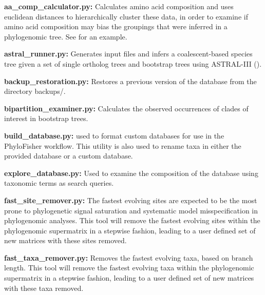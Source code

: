 \documentclass{article}
\begin{document}
    \begin{description}
    \item \textbf{aa\_comp\_calculator.py:} Calculates amino acid composition and uses euclidean distances to hierarchically cluster these data, in order to examine if amino acid composition may bias the groupings that were inferred in a phylogenomic tree. See \cite{brown_phylogenomics_2018} for an example.
    
    \item \textbf{astral\_runner.py:} Generates input files and infers a coalescent-based species tree given a set of single ortholog trees and bootstrap trees using ASTRAL-III (\cite{zhang_astral-iii_2018}). 

    \item \textbf{backup\_restoration.py:} Restores a previous version of the database from  the directory backups/.

    \item \textbf{bipartition\_examiner.py:} Calculates the observed occurrences of clades of interest in bootstrap trees.

    \item \textbf{build\_database.py:} used to format custom databases for use in the PhyloFisher workflow. This utility is also used to rename taxa in either the provided database or a custom database.

    \item \textbf{explore\_database.py:} Used to examine the composition of the database using taxonomic terms as search queries.

    \item \textbf{fast\_site\_remover.py:} The fastest evolving sites are expected to be the most prone to phylogenetic signal saturation and systematic model misspecification in phylogenomic analyses. This tool will remove the fastest evolving sites within the phylogenomic supermatrix in a stepwise fashion, leading to a user defined set of new matrices with these sites removed.

    \item \textbf{fast\_taxa\_remover.py:} Removes the fastest evolving taxa, based on branch length. This tool will remove the fastest evolving taxa within the phylogenomic supermatrix in a stepwise fashion, leading to a user defined set of new matrices with these taxa removed.


\end{description}
\end{document}
